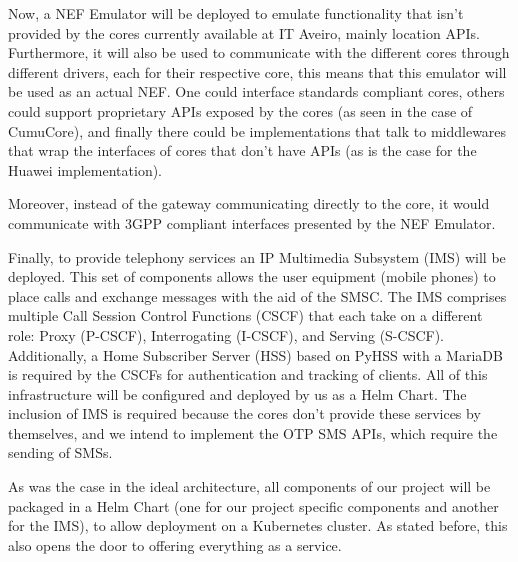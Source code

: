 Now, a NEF Emulator will be deployed to emulate functionality that isn't provided by the cores currently available at IT Aveiro, mainly location APIs. Furthermore, it will also be used to communicate with the different cores through different drivers, each for their respective core, this means that this emulator will be used as an actual NEF. One could interface standards compliant cores, others could support proprietary APIs exposed by the cores (as seen in the case of CumuCore), and finally there could be implementations that talk to middlewares that wrap the interfaces of cores that don't have APIs (as is the case for the Huawei implementation).

Moreover, instead of the gateway communicating directly to the core, it would communicate with 3GPP compliant interfaces presented by the NEF Emulator.

Finally, to provide telephony services an IP Multimedia Subsystem (IMS) will be deployed. This set of components allows the user equipment (mobile phones) to place calls and exchange messages with the aid of the SMSC. The IMS comprises multiple Call Session Control Functions (CSCF) that each take on a different role: Proxy (P-CSCF), Interrogating (I-CSCF), and Serving (S-CSCF). Additionally, a Home Subscriber Server (HSS) based on PyHSS with a MariaDB is required by the CSCFs for authentication and tracking of clients. All of this infrastructure will be configured and deployed by us as a Helm Chart. The inclusion of IMS is required because the cores don't provide these services by themselves, and we intend to implement the OTP SMS APIs, which require the sending of SMSs.

As was the case in the ideal architecture, all components of our project will be packaged in a Helm Chart (one for our project specific components and another for the IMS), to allow deployment on a Kubernetes cluster. As stated before, this also opens the door to offering everything as a service.


